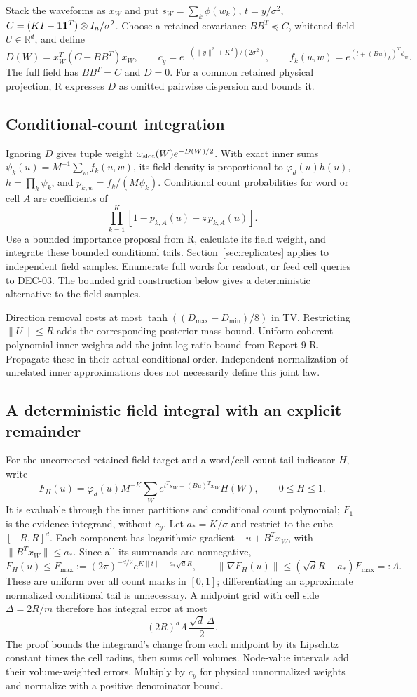 \documentclass[10pt,a4paper]{article}
\begin{document}
Stack the waveforms as $x_W$ and put $s_W=\sum_k\phi(w_k)$,
$t=y/\sigma^2$, $C=(KI-\mathbf{1}\mathbf{1}^T)\otimes I_n/\sigma^2$.
Choose a retained covariance $BB^T\preceq C$, whitened field $U\in\mathbb R^d$, and define
\[
 D(W)=x_W^T(C-BB^T)x_W,\qquad
 c_y=e^{-(\|y\|^2+K^2)/(2\sigma^2)},\qquad
 f_k(u,w)=e^{(t+(Bu)_k)^T\phi_w}.
\]
The full field has $BB^T=C$ and $D=0$.
For a common retained physical projection, R expresses $D$ as omitted pairwise dispersion and bounds it.

\subsection{Conditional-count integration}
Ignoring $D$ gives tuple weight $\omega_{\rm slot}(W)e^{-D(W)/2}$.
With exact inner sums $\psi_k(u)=M^{-1}\sum_w f_k(u,w)$, its field density is proportional to
$\varphi_d(u)h(u)$, $h=\prod_k\psi_k$, and
$p_{k,w}=f_k/(M\psi_k)$.
Conditional count probabilities for word or cell $A$ are coefficients of
\[
 \prod_{k=1}^K[1-p_{k,A}(u)+z\,p_{k,A}(u)].
\]
Use a bounded importance proposal from R, calculate its field weight, and integrate these bounded
conditional tails. Section~\ref{sec:replicates} applies to independent field samples.
Enumerate full words for readout, or feed cell queries to DEC-03.
The bounded grid construction below gives a deterministic alternative to the field samples.

Direction removal costs at most $\tanh((D_{\max}-D_{\min})/8)$ in TV.
Restricting $\|U\|\leq R$ adds the corresponding posterior mass bound.
Uniform coherent polynomial inner weights add the joint log-ratio bound from Report 9 R.
Propagate these in their actual conditional order. Independent normalization of unrelated inner
approximations does not necessarily define this joint law.

\subsection{A deterministic field integral with an explicit remainder}
For the uncorrected retained-field target and a word/cell count-tail indicator $H$, write
\[
 F_H(u)=\varphi_d(u)M^{-K}\sum_W
              e^{t^Ts_W+(Bu)^Tx_W}H(W),\qquad 0\leq H\leq1.
\]
It is evaluable through the inner partitions and conditional count polynomial; $F_1$ is the evidence
integrand, without $c_y$. Let $a_*=K/\sigma$ and restrict to the cube $[-R,R]^d$.
Each component has logarithmic gradient $-u+B^Tx_W$, with $\|B^Tx_W\|\leq a_*$.
Since all its summands are nonnegative,
\[
 F_H(u)\leq F_{\max}:=(2\pi)^{-d/2}e^{K\|t\|+a_*\sqrt d R},\qquad
 \|\nabla F_H(u)\|\leq(\sqrt d R+a_*)F_{\max}=:\Lambda.
\]
These are uniform over all count marks in $[0,1]$; differentiating an approximate normalized
conditional tail is unnecessary.
A midpoint grid with cell side $\Delta=2R/m$ therefore has integral error at most
\[
 (2R)^d\Lambda\,\frac{\sqrt d\,\Delta}{2}.
\]
The proof bounds the integrand's change from each midpoint by its Lipschitz constant times the
cell radius, then sums cell volumes. Node-value intervals add their volume-weighted errors.
Multiply by $c_y$ for physical unnormalized weights and normalize with a positive denominator bound.
\end{document}
